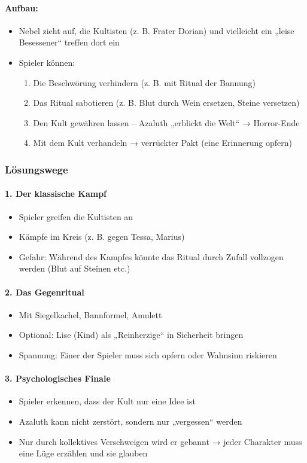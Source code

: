 \paragraph{Aufbau:}
\begin{itemize}
\item Nebel zieht auf, die Kultisten (z. B. Frater Dorian) und vielleicht ein „leise Besessener“ treffen dort ein
\item Spieler können:
    \begin{enumerate}
    \item Die Beschwörung verhindern (z. B. mit Ritual der Bannung)
    \item Das Ritual sabotieren (z. B. Blut durch Wein ersetzen, Steine versetzen)
    \item Den Kult gewähren lassen – Azaluth „erblickt die Welt“ → Horror-Ende
    \item Mit dem Kult verhandeln → verrückter Pakt (eine Erinnerung opfern)
    \end{enumerate}
\end{itemize}

\subsubsection{Lösungswege}
\paragraph{1. Der klassische Kampf}
\begin{itemize}
\item Spieler greifen die Kultisten an
\item Kämpfe im Kreis (z. B. gegen Tessa, Marius)
\item Gefahr: Während des Kampfes könnte das Ritual durch Zufall vollzogen werden (Blut auf Steinen etc.)
\end{itemize}
\paragraph{2. Das Gegenritual}
\begin{itemize}
\item Mit Siegelkachel, Bannformel, Amulett
\item Optional: Lise (Kind) als „Reinherzige“ in Sicherheit bringen
\item Spannung: Einer der Spieler muss sich opfern oder Wahnsinn riskieren
\end{itemize}
\paragraph{3. Psychologisches Finale}
\begin{itemize}
\item Spieler erkennen, dass der Kult nur eine Idee ist
\item Azaluth kann nicht zerstört, sondern nur „vergessen“ werden
\item Nur durch kollektives Verschweigen wird er gebannt → jeder Charakter muss eine Lüge erzählen und sie glauben
\end{itemize}
